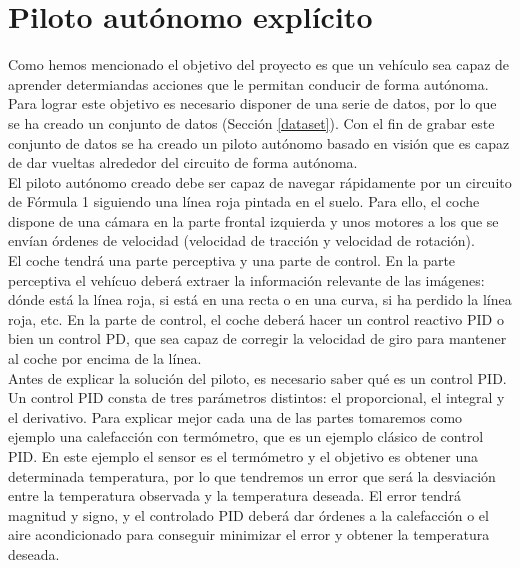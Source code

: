 \section{Piloto autónomo explícito}\label{piloto}

Como hemos mencionado el objetivo del proyecto es que un vehículo sea capaz de aprender determiandas acciones que le permitan conducir de forma autónoma. Para lograr este objetivo es necesario disponer de una serie de datos, por lo que se ha creado un conjunto de datos (Sección \ref{dataset}). Con el fin de grabar este conjunto de datos se ha creado un piloto autónomo basado en visión que es capaz de dar vueltas alrededor del circuito de forma autónoma. \\

El piloto autónomo creado debe ser capaz de navegar rápidamente por un circuito de Fórmula 1 siguiendo una línea roja pintada en el suelo. Para ello, el coche dispone de una cámara en la parte frontal izquierda y unos motores a los que se envían órdenes de velocidad (velocidad de tracción y velocidad de rotación).\\

El coche tendrá una parte perceptiva y una parte de control. En la parte perceptiva el vehícuo deberá extraer la información relevante de las imágenes: dónde está la línea roja, si está en una recta o en una curva, si ha perdido la línea roja, etc. En la parte de control, el coche deberá hacer un control reactivo PID o bien un control PD, que sea capaz de corregir la velocidad de giro para mantener al coche por encima de la línea.\\ 

Antes de explicar la solución del piloto, es necesario saber qué es un control PID. Un control PID consta de tres parámetros distintos: el proporcional, el integral y el derivativo. Para explicar mejor cada una de las partes tomaremos como ejemplo una calefacción con termómetro, que es un ejemplo clásico de control PID.  En este ejemplo el sensor es el termómetro y el objetivo es obtener una determinada temperatura, por lo que tendremos un error que será la desviación entre la temperatura observada y la temperatura deseada. El error tendrá magnitud y signo, y el controlado PID deberá dar órdenes a la calefacción o el aire acondicionado para conseguir minimizar el error y obtener la temperatura deseada.\\


